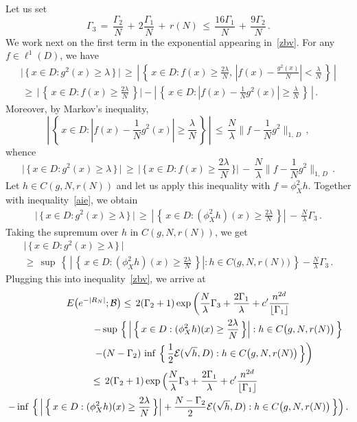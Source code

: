 \documentclass[AHL, Unicode, longabstracts, published]{cedram}
\newcommand{\cB}{\mathcal{B}}
\newcommand{\cE}{\mathcal{E}}
\begin{document}
Let us set
\begin{equation}\label{ultg}
\Gamma_3\,=\,
\frac{\Gamma_2}{{N}}\,+\, 2\frac{\Gamma_1}{{N}}\,+\, r(N)
\,\leq\,
\frac{16\Gamma_1}{{N}}\,+\,
\frac{9\Gamma_2}{{N}}
\,.
\end{equation}
We work next on the first term in the exponential appearing in~\eqref{zbv}. For any $f\in\ell^1(D)$, we have
\begin{align*}
\Big|\,\Big\{\,x\in D:g^2(x)\geq\lambda\,\Big\}\,\Big|\,\geq\,
\left|\,\left\{\,x\in D:f(x)\geq\frac{2\lambda}{N},\,
\left|f(x)-\frac{g^2(x)}{N}\right|<\frac{\lambda}{N}\,\right\}\,\right|\\
\,\geq\,
\Big|\,\left\{\,x\in D: f(x)\geq\frac{2\lambda}{N}
\,\right\}\Big|-
\left|\,\left\{\,x\in D:
\left|f(x)-\frac{1}{N}g^2(x)\right|\geq\frac{\lambda}{N}
\,\right\}\,\right|\,.
\end{align*}
Moreover, by Markov's inequality,
\[
\left|\,\left\{\,x\in D:
\left|f(x)-\frac{1}{N}g^2(x)\right|\geq\frac{\lambda}{N}
\,\right\}\,\right|\,\leq\,
\frac{N}{\lambda}\Big\| f-\frac{1}{N}g^2
\Big\|_{1,\,D}
\,,
\]
whence
\[
\Big|\,\Big\{\,x\in D:g^2(x)\geq\lambda\,\Big\}\,\Big|\,\geq\,
\Big|\,\Big\{\,x\in D: f(x)\geq\frac{2\lambda}{N}
\,\Big\}\Big|\,-\,
\frac{N}{\lambda}\Big\| f-\frac{1}{N}g^2
\Big\|_{1,\,D}\,.
\]
Let $h \in C(g,N, r(N))$ and let us apply this inequality with $f=\phi_X^2h$. Together with inequality~\eqref{aie}, we obtain
\begin{align*}
\Big|\,\Big\{\,x\in D:g^2(x)\geq\lambda\,\Big\}\,\Big|\,\geq\,
\left|\,\left\{\,x\in D: (\phi_X^2h)(x)\geq\frac{2\lambda}{N}
\,\right\}\right|\,-\,
\frac{N}{\lambda}\Gamma_3\,.
\end{align*}
Taking the supremum over $h$ in $C(g,N, r(N))$, we get
\begin{multline*}
\Big|\,\Big\{\,x\in D:g^2(x)\geq\lambda\,\Big\}\,\Big|\,
\\
\geq\,\sup\,\left\{\,
\left|\,\left\{\,x\in D: (\phi_X^2h)(x)\geq\frac{2\lambda}{N}
\,\right\}\right|: h\in C\big(g,N, r(N)\big)\,\right\} -\frac{N}{\lambda}\Gamma_3\,.
\end{multline*}
Plugging this into inequality~\eqref{zbv}, we arrive at
\begin{multline*}
E\big(e^{-|R_N|};\cB \big)
\leq\, 2(\Gamma_2+1)
\exp\bigg(
\frac{N}{\lambda}\Gamma_3 +\frac{2\Gamma_1}{\lambda} + c'\frac{n^{2d}}{\lfloor\Gamma_1\rfloor}
\\
\mkern150mu -\sup\,\Big\{\,
\Big|\,\Big\{\,x\in D: (\phi_X^2h)(x)\geq\frac{2\lambda}{N}
\,\Big\}\Big| : h\in C\big(g,N, r(N)\big)
\,\Big\}
\\
\mkern97mu-(N-\Gamma_2)\,\inf\,\Big\{\,
\frac{1} {2}\cE(\sqrt{h},D) : h\in C\big(g,N, r(N)\big)
\,\Big\}
\bigg)
\\
\mkern-10mu\leq\, 2(\Gamma_2+1)
\exp\Big(
\frac{N}{\lambda}\Gamma_3 +\frac{2\Gamma_1}{\lambda} + c'\frac{n^{2d}}{\lfloor\Gamma_1\rfloor}
\\
-
\inf\,\Big\{\,
\Big|\,\Big\{\,x\in D: (\phi_X^2h)(x)\geq\frac{2\lambda}{N}
\,\Big\}\Big|+
\frac{N-\Gamma_2}{2}\cE(\sqrt{h},D) : h\in C\big(g,N, r(N)\big)
\,\Big\}\Big)
\,.
\end{multline*}
\end{document}
